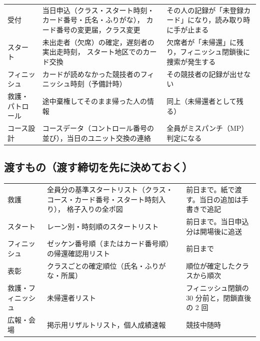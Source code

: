 \begin{center}
\begin{tabular}{@{}P{20mm}P{68mm}P{62mm}@{}}
\toprule
{} &  &  \\
\midrule
受付 & 当日申込（クラス・スタート時刻・カード番号・氏名・ふりがな），
       カード番号の変更届，クラス変更 & その人の記録が「未登録カード」になり，読み取り時に手が止まる \\
スタート & 未出走者（欠席）の確定，遅刻者の実出走時刻，
           スタート地区でのカード交換 & 欠席者が「未帰還」に残り，フィニッシュ閉鎖後に捜索が発生する \\
フィニッシュ & カードが読めなかった競技者のフィニッシュ時刻（予備計時）
              & その競技者の記録が出せない \\
救護・パトロール & 途中棄権してそのまま帰った人の情報 & 同上（未帰還者として残る） \\
コース設計 & コースデータ（コントロール番号の並び），当日のユニット交換の連絡
            & 全員がミスパンチ（MP）判定になる \\
\bottomrule
\end{tabular}
\end{center}

\subsection*{渡すもの（渡す締切を先に決めておく）}

\begin{center}
\begin{tabular}{@{}P{20mm}P{58mm}P{72mm}@{}}
\toprule
{} &  &  \\
\midrule
救護 & 全員分の基準スタートリスト（クラス・コース・カード番号・スタート時刻入り），
       格子入りの全ポ図 & 前日まで。紙で渡す。当日の追加は手書きで追記 \\
スタート & レーン別・時刻順のスタートリスト & 前日まで。当日申込分は開場後に追送 \\
フィニッシュ & ゼッケン番号順（またはカード番号順）の帰還確認用リスト & 前日まで \\
表彰 & クラスごとの確定順位（氏名・ふりがな・所属） & 順位が確定したクラスから順次 \\
救護・フィニッシュ & 未帰還者リスト & フィニッシュ閉鎖の 30 分前と，閉鎖直後の 2 回 \\
広報・会場 & 掲示用リザルトリスト，個人成績速報 & 競技中随時 \\
\bottomrule
\end{tabular}
\end{center}

